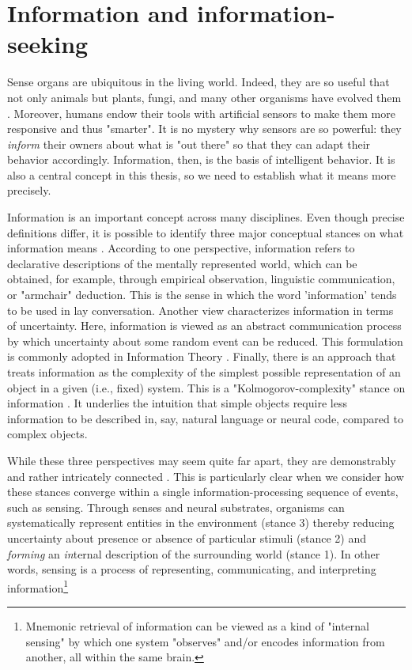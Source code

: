 \section{Information and information-seeking}\label{CH2_s_information_and_information_seeking}

Sense organs are ubiquitous in the living world. Indeed, they are so useful that not only animals but plants, fungi, and many other organisms have evolved them \parencite{trewavas_plant_2005,braunsdorf_fungal_2016,bourret_census_2006,schwab_evolution_2018}. Moreover, humans endow their tools with artificial sensors to make them more responsive and thus "smarter". %
It is no mystery why sensors are so powerful: they \emph{inform} their owners about what is "out there" so that they can adapt their behavior accordingly. Information, then, is the basis of intelligent behavior. It is also a central concept in this thesis, so we need to establish what it means more precisely. 

Information is an important concept across many disciplines. Even though precise definitions differ, it is possible to identify three major conceptual stances on what information means \parencite{adriaans_introduction_2008}. According to one perspective, information refers to declarative descriptions of the mentally represented world, which can be obtained, for example, through empirical observation, linguistic communication, or "armchair" deduction. This is the sense in which the word 'information' tends to be used in lay conversation. Another view characterizes information in terms of uncertainty. Here, information is viewed as an abstract communication process by which uncertainty about some random event can be reduced. This formulation is commonly adopted in Information Theory \parencite{shannon_mathematical_1948}. Finally, there is an approach that treats information as the complexity of the simplest possible representation of an object in a given (i.e., fixed) system. This is a "Kolmogorov-complexity" stance on information \parencite{kolmogorov1965three}. It underlies the intuition that simple objects require less information to be described in, say, natural language or neural code, compared to complex objects.

While these three perspectives may seem quite far apart, they are demonstrably and rather intricately connected \parencite{adriaans_introduction_2008}. This is particularly clear when we consider how these stances converge within a single information-processing sequence of events, such as sensing. Through senses and neural substrates, organisms can systematically represent entities in the environment (stance 3) thereby reducing uncertainty about presence or absence of particular stimuli (stance 2) and \emph{forming} an \emph{in}ternal description of the surrounding world (stance 1). In other words, sensing is a process of representing, communicating, and interpreting information\footnote{Mnemonic retrieval of information can be viewed as a kind of "internal sensing" by which one system "observes" and/or encodes information from another, all within the same brain.}


